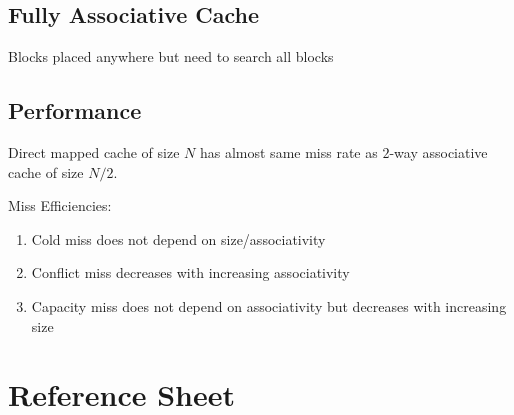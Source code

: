\documentclass[12pt, a4paper]{article}
\begin{document}
\begin{multicols*}{3}
\subsection{Fully Associative Cache}
Blocks placed anywhere but need to search all blocks 

{\centering{}\par}

\subsection{Performance}

Direct mapped cache of size $N$ has almost same miss rate as $2$-way associative cache of size $N/2$.

Miss Efficiencies:
\begin{enumerate}[\roman*.]
  \item Cold miss does not depend on size/associativity
  \item Conflict miss decreases with increasing associativity
  \item Capacity miss does not depend on associativity but decreases with increasing size
\end{enumerate}

\end{multicols*}
\section*{Reference Sheet}

\begin{minipage}{0.40\columnwidth}
\end{minipage}
\begin{minipage}{0.58\columnwidth}

\end{minipage}

\end{document}
